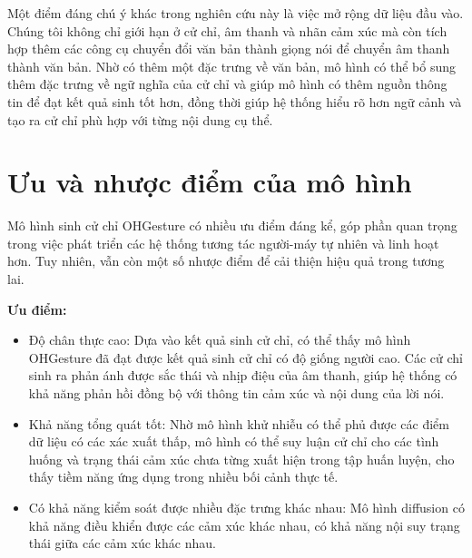 Một điểm đáng chú ý khác trong nghiên cứu này là việc mở rộng dữ liệu đầu vào. Chúng tôi không chỉ giới hạn ở cử chỉ, âm thanh và nhãn cảm xúc mà còn tích hợp thêm các công cụ chuyển đổi văn bản thành giọng nói để chuyển âm thanh thành văn bản. Nhờ có thêm một đặc trưng về văn bản, mô hình có thể bổ sung thêm đặc trưng về ngữ nghĩa của cử chỉ và giúp mô hình có thêm nguồn thông tin để đạt kết quả sinh tốt hơn, đồng thời giúp hệ thống hiểu rõ hơn ngữ cảnh và tạo ra cử chỉ phù hợp với từng nội dung cụ thể.




\section{Ưu và nhược điểm của mô hình}


Mô hình sinh cử chỉ OHGesture có nhiều ưu điểm đáng kể, góp phần quan trọng trong việc phát triển các hệ thống tương tác người-máy tự nhiên và linh hoạt hơn. Tuy nhiên, vẫn còn một số nhược điểm để cải thiện hiệu quả trong tương lai.

\vspace{10pt}

\textbf{Ưu điểm:}

\begin{itemize}
	\item Độ chân thực cao: Dựa vào kết quả sinh cử chỉ, có thể thấy mô hình OHGesture đã đạt được kết quả sinh cử chỉ có độ giống người cao. Các cử chỉ sinh ra phản ánh được sắc thái và nhịp điệu của âm thanh, giúp hệ thống có khả năng phản hồi đồng bộ với thông tin cảm xúc và nội dung của lời nói.
	
	\item Khả năng tổng quát tốt: Nhờ mô hình khử nhiễu có thể phủ được các điểm dữ liệu có các xác xuất thấp, mô hình có thể suy luận cử chỉ cho các tình huống và trạng thái cảm xúc chưa từng xuất hiện trong tập huấn luyện, cho thấy tiềm năng ứng dụng trong nhiều bối cảnh thực tế.
	
	\item Có khả năng kiểm soát được nhiều đặc trưng khác nhau: Mô hình diffusion có khả năng điều khiển được các cảm xúc khác nhau, có khả năng nội suy trạng thái giữa các cảm xúc khác nhau.
	
	
	
	\end{itemize}



